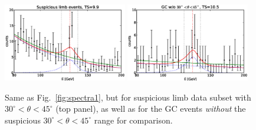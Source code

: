 \documentclass[aps,twocolumn,prd,superscriptaddress,showpacs,nofootinbib,fixfloat]{revtex4}
\begin{document}
\begin{figure}
  \centering
  \includegraphics[width=0.48\textwidth]{plots/counts_suspiciousLimb.eps}
  \includegraphics[width=0.48\textwidth]{plots/counts_GC_wo3045.eps}
  \caption{Same as Fig.~\ref{fig:spectra1}, but for
  suspicious limb data subset with
  $30^\circ<\theta<45^\circ$ (top panel), as well as for the
  GC events \emph{without} the suspicious
  $30^\circ<\theta<45^\circ$ range for comparison.}
  \label{fig:spectra2}
\end{figure}
\end{document}
